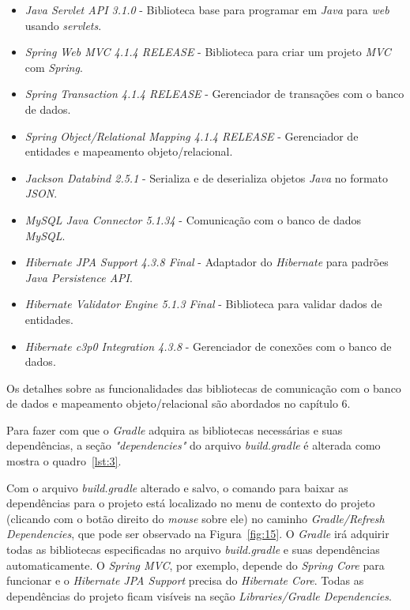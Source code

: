 \documentclass[a4paper,12pt]{article}
\newcommand{\est}[1] {
\textit{#1}}
\newcommand{\arquivo}[1] {
\textit{#1}}
\newcommand{\sigla}[1] {
\textit{#1}}
\newcommand{\lang}[1] {
\textit{#1}}
\newcommand{\lib}[1] {
\textit{#1}}
\newcommand{\groovycode}[3] {
	
}
\begin{document}
\begin{itemize}
  \item \lib{Java Servlet API 3.1.0} - Biblioteca base para programar em \lang{Java} para \est{web} usando \est{servlets}.
  \item \lib{Spring Web MVC 4.1.4 RELEASE} - Biblioteca para criar um projeto \sigla{MVC} com \est{Spring}.
  \item \lib{Spring Transaction 4.1.4 RELEASE} - Gerenciador de transações com o banco de dados.
  \item \lib{Spring Object/Relational Mapping 4.1.4 RELEASE} - Gerenciador de entidades e mapeamento objeto/relacional.
  \item \lib{Jackson Databind 2.5.1} - Serializa e de deserializa objetos \lang{Java} no formato \sigla{JSON}.
  \item \lib{MySQL Java Connector 5.1.34} - Comunicação com o banco de dados \est{MySQL}.
  \item \lib{Hibernate JPA Support 4.3.8 Final} - Adaptador do \est{Hibernate} para padrões \est{Java Persistence API}.
  \item \lib{Hibernate Validator Engine 5.1.3 Final} - Biblioteca para validar dados de entidades.
  \item \lib{Hibernate c3p0 Integration 4.3.8} - Gerenciador de conexões com o banco de dados.
\end{itemize}

Os detalhes sobre as funcionalidades das bibliotecas de comunicação com o banco de dados e mapeamento objeto/relacional são abordados no capítulo 6. 

Para fazer com que o \est{Gradle} adquira as bibliotecas necessárias e suas dependências, a seção \est{"dependencies"} do arquivo \arquivo{build.gradle} é alterada como mostra o quadro~\ref{lst:3}.

\groovycode{code/gradledependencies.txt}{Adicionando dependências ao projeto}{lst:3}

Com o arquivo \arquivo{build.gradle} alterado e salvo, o comando para baixar as dependências para o projeto está localizado no menu de contexto do projeto (clicando com o botão direito do \est{mouse} sobre ele) no caminho \est{Gradle/Refresh Dependencies}, que pode ser observado na Figura~\ref{fig:15}. O \est{Gradle} irá adquirir todas as bibliotecas especificadas no arquivo \arquivo{build.gradle} e suas dependências automaticamente. O \est{Spring MVC}, por exemplo, depende do \est{Spring Core} para funcionar e o \est{Hibernate JPA Support} precisa do \est{Hibernate Core}. Todas as dependências do projeto ficam visíveis na seção \est{Libraries/Gradle Dependencies}.
\end{document}
